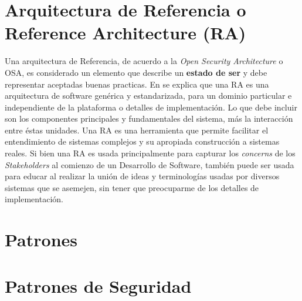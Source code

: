 \section{Arquitectura de Referencia o Reference Architecture (RA)}
\label{chap2:ArqRef}

Una arquitectura de Referencia, de acuerdo a la \textit{Open Security Architecture} o OSA\cite{openSecArch}, es considerado un elemento que describe un \textbf{estado de ser} y debe representar aceptadas buenas practicas. En \cite{Avgeriou2003} se explica que una RA es una arquitectura de software genérica y estandarizada, para un dominio particular e independiente de la plataforma o detalles de implementación. Lo que debe incluir son los componentes principales y fundamentales del sistema, más la interacción entre éstas unidades. Una RA es una herramienta que permite facilitar el entendimiento de sistemas complejos y su apropiada construcción a sistemas reales. Si bien una RA es usada principalmente para capturar los \textit{concerns} de los \textit{Stakeholders} al comienzo de un Desarrollo de Software, también puede ser usada para educar al realizar la unión de ideas y terminologías usadas por diversos sistemas que se asemejen, sin tener que preocuparme de los detalles de implementación.


\section{Patrones}
\label{chap2:Patt}

\section{Patrones de Seguridad}
\label{chap2:SecPatt}

